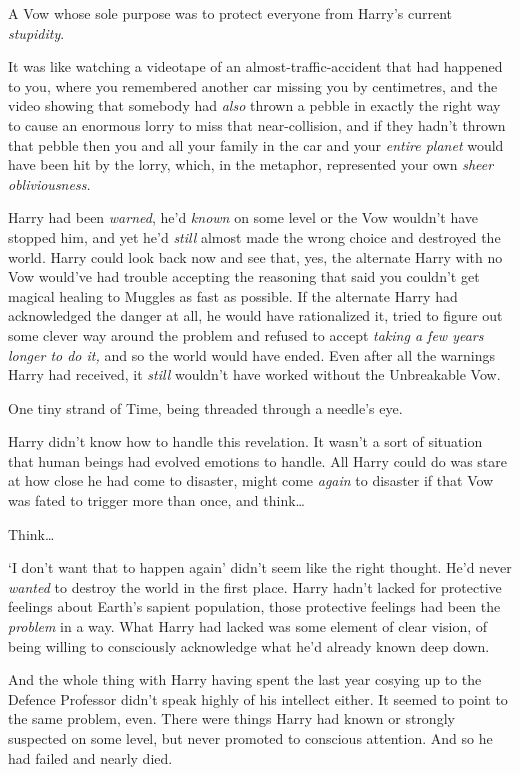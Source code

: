 A Vow whose sole purpose was to protect everyone from Harry’s current \emph{stupidity}.

It was like watching a videotape of an almost-traffic-accident that had happened to you, where you remembered another car missing you by centimetres, and the video showing that somebody had \emph{also} thrown a pebble in exactly the right way to cause an enormous lorry to miss that near-collision, and if they hadn’t thrown that pebble then you and all your family in the car and your \emph{entire planet} would have been hit by the lorry, which, in the metaphor, represented your own \emph{sheer obliviousness.}

Harry had been \emph{warned}, he’d \emph{known} on some level or the Vow wouldn’t have stopped him, and yet he’d \emph{still} almost made the wrong choice and destroyed the world. Harry could look back now and see that, yes, the alternate Harry with no Vow would’ve had trouble accepting the reasoning that said you couldn’t get magical healing to Muggles as fast as possible. If the alternate Harry had acknowledged the danger at all, he would have rationalized it, tried to figure out some clever way around the problem and refused to accept \emph{taking a few years longer to do it,} and so the world would have ended. Even after all the warnings Harry had received, it \emph{still} wouldn’t have worked without the Unbreakable Vow.

One tiny strand of Time, being threaded through a needle’s eye.

Harry didn’t know how to handle this revelation. It wasn’t a sort of situation that human beings had evolved emotions to handle. All Harry could do was stare at how close he had come to disaster, might come \emph{again} to disaster if that Vow was fated to trigger more than once, and think…

Think…

‘I don’t want that to happen again’ didn’t seem like the right thought. He’d never \emph{wanted} to destroy the world in the first place. Harry hadn’t lacked for protective feelings about Earth’s sapient population, those protective feelings had been the \emph{problem} in a way. What Harry had lacked was some element of clear vision, of being willing to consciously acknowledge what he’d already known deep down.

And the whole thing with Harry having spent the last year cosying up to the Defence Professor didn’t speak highly of his intellect either. It seemed to point to the same problem, even. There were things Harry had known or strongly suspected on some level, but never promoted to conscious attention. And so he had failed and nearly died.

